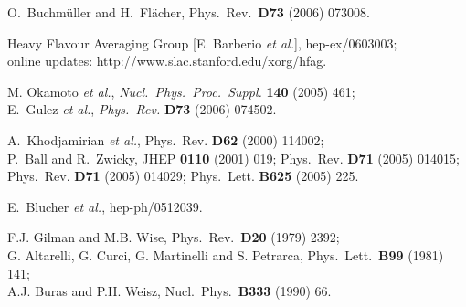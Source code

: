 \documentclass[12pt]{article}
\begin{document}
\begin{thebibliography}{999}
  O.~Buchm\"uller and H.~Fl\"acher,
 Phys.\ Rev.\ {\bf D73} (2006) 073008.
  
Heavy Flavour Averaging Group [E. Barberio {\it et al.}], 
hep-ex/0603003;\\ online updates: http://www.slac.stanford.edu/xorg/hfag. 

M. Okamoto {\it et al.},
 {\it Nucl.\ Phys.\ Proc.\ Suppl.} {\bf 140} (2005) 461;\\
E.~Gulez {\it et al.},
{\it Phys.\ Rev.} {\bf D73} (2006) 074502.

A.~Khodjamirian {\it et al.},
{  Phys.\ Rev.} {\bf D62} (2000) 114002;\\
  P.~Ball and R.~Zwicky,
{  JHEP} {\bf 0110} (2001) 019;
{  Phys.\ Rev.} {\bf D71} (2005) 014015;
{ Phys.\ Rev.} {\bf D71} (2005) 014029;
{  Phys.\ Lett.} {\bf B625} (2005) 225.

E.~Blucher {\it et al.},
  hep-ph/0512039.

F.J. Gilman and M.B. Wise,
{ Phys.\ Rev.}~{\bf D20} (1979) 2392;\\
G. Altarelli, G. Curci, G. Martinelli and S. Petrarca,
{ Phys.\ Lett.}~{\bf B99} (1981) 141;\\
A.J. Buras and P.H. Weisz,
{ Nucl.\ Phys.}~{\bf B333} (1990) 66.


\end{thebibliography}
\end{document}
